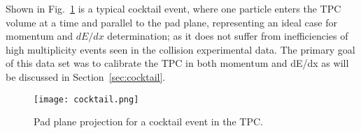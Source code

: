 Shown in Fig.~\ref{fig:cocktail} is a typical cocktail event, where one particle enters the TPC volume at a time and parallel to the pad plane, representing an ideal case for momentum and $dE/dx$ determination; as it does not suffer from inefficiencies of high multiplicity events seen in the collision experimental data. The primary goal of this data set was to calibrate the TPC in both momentum and dE/dx as will be discussed in Section~\ref{sec:cocktail}. 

\begin{figure}[!htb]
\texttt{[image: cocktail.png]}
\caption{Pad plane projection for a cocktail event in the TPC.}
\label{fig:cocktail}
\end{figure}


